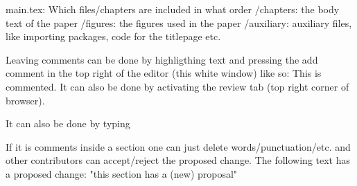 main.tex: Which files/chapters are included in what order
/chapters: the body text of the paper
/figures: the figures used in the paper
/auxiliary: auxiliary files, like importing packages, code for the titlepage etc.

Leaving comments can be done by highligthing text and pressing the add comment in the top right of the editor (this white window) like so: This is commented. It can also be done by activating the review tab (top right corner of browser).


It can also be done by typing %

If it is comments inside a section one can just delete words/punctuation/etc. and other contributors can accept/reject the proposed change. The following text has a proposed change: "this section has a (new) proposal"